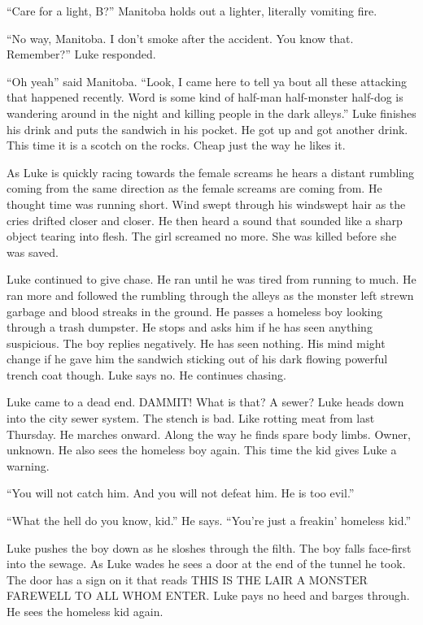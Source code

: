 ``Care for a light, B?'' Manitoba holds out a lighter,
literally vomiting fire.



``No way, Manitoba. I don't smoke after the accident.
You know that. Remember?'' Luke responded.



``Oh yeah'' said Manitoba. ``Look, I came here to
tell ya bout all these attacking that happened recently. Word is
some kind of half-man half-monster half-dog is wandering around in
the night and killing people in the dark alleys.'' Luke
finishes his drink and puts the sandwich in his pocket. He got up
and got another drink. This time it is a scotch on the rocks. Cheap
just the way he likes it.



As Luke is quickly racing towards the female screams he hears a
distant rumbling coming from the same direction as the female
screams are coming from. He thought time was running short. Wind
swept through his windswept hair as the cries drifted closer and
closer. He then heard a sound that sounded like a sharp object
tearing into flesh. The girl screamed no more. She was killed
before she was saved.



Luke continued to give chase. He ran until he was tired from
running to much. He ran more and followed the rumbling through the
alleys as the monster left strewn garbage and blood streaks in the
ground. He passes a homeless boy looking through a trash dumpster.
He stops and asks him if he has seen anything suspicious. The boy
replies negatively. He has seen nothing. His mind might change if
he gave him the sandwich sticking out of his dark flowing powerful
trench coat though. Luke says no. He continues chasing.



Luke came to a dead end. DAMMIT! What is that? A sewer? Luke heads
down into the city sewer system. The stench is bad. Like rotting
meat from last Thursday. He marches onward. Along the way he finds
spare body limbs. Owner, unknown. He also sees the homeless boy
again. This time the kid gives Luke a warning.



``You will not catch him. And you will not defeat him. He is
too evil.''



``What the hell do you know, kid.'' He says.
``You're just a freakin' homeless
kid.''

Luke pushes the boy down as he sloshes through the filth. The boy
falls face-first into the sewage. As Luke wades he sees a door at
the end of the tunnel he took. The door has a sign on it that reads
THIS IS THE LAIR A MONSTER FAREWELL TO ALL WHOM ENTER. Luke pays no
heed and barges through. He sees the homeless kid again.



